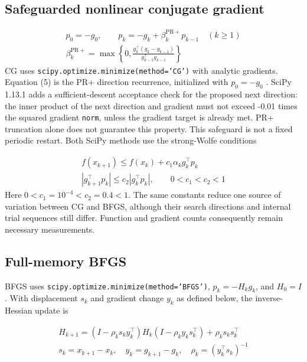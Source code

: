 \documentclass[10pt]{article}
\begin{document}
\subsection{Safeguarded nonlinear conjugate gradient}
\setcounter{equation}{4}
\begin{equation}
\begin{aligned}
p_0=-g_0,\qquad p_k=-g_k+\beta_k^{\mathrm{PR+}}p_{k-1}\quad(k\geq1) \\
\beta_k^{\mathrm{PR+}}=\max\left\{0,\frac{g_k^\top(g_k-g_{k-1})}{g_{k-1}^\top g_{k-1}}\right\}
\end{aligned}
\label{eq:cg}
\end{equation}
CG uses \texttt{scipy.optimize.minimize(method='CG')} with analytic gradients. Equation (5) is the PR+ direction recurrence, initialized with \(p_0=-g_0\) \cite{ref3,ref7}. SciPy 1.13.1 adds a sufficient-descent acceptance check for the proposed next direction: the inner product of the next direction and gradient must not exceed -0.01 times the squared gradient \texttt{norm}, unless the gradient target is already met. PR+ truncation alone does not guarantee this property. This safeguard is not a fixed periodic restart. Both SciPy methods use the strong-Wolfe conditions

\setcounter{equation}{5}
\begin{equation}
\begin{aligned}
f(x_{k+1})\leq f(x_k)+c_1\alpha_k g_k^\top p_k \\
|g_{k+1}^\top p_k|\leq c_2|g_k^\top p_k|,\qquad 0<c_1<c_2<1
\end{aligned}
\label{eq:wolfe}
\end{equation}
Here \(0<c_1=10^{-4}<c_2=0.4<1\). The same constants reduce one source of variation between CG and BFGS, although their search directions and internal trial sequences still differ. Function and gradient counts consequently remain necessary measurements.

\setcounter{section}{4}
\setcounter{subsection}{2}
\subsection{Full-memory BFGS}
BFGS uses \texttt{scipy.optimize.minimize(method='BFGS')}, \(p_k=-H_k g_k\), and \(H_0=I\). With displacement \(s_k\) and gradient change \(y_k\) as defined below, the inverse-Hessian update is \cite{ref1,ref4}

\setcounter{equation}{6}
\begin{equation}
\begin{aligned}
H_{k+1}=(I-\rho_k s_k y_k^\top)H_k(I-\rho_k y_k s_k^\top)+\rho_k s_k s_k^\top \\
s_k=x_{k+1}-x_k,\quad y_k=g_{k+1}-g_k,\quad\rho_k=(y_k^\top s_k)^{-1}
\end{aligned}
\label{eq:bfgs}
\end{equation}
\setcounter{section}{4}
\setcounter{subsection}{3}
\end{document}
